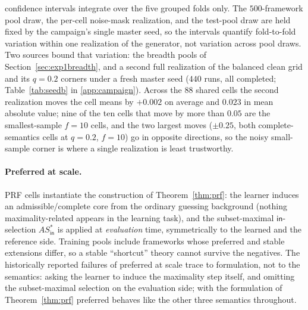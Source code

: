 \documentclass[review,12pt]{elsarticle}
\theoremstyle{definition}
\theoremstyle{remark}
\newcommand{\pred}[1]{\textsf{#1}}
\newcommand{\ASstar}{\mathit{AS}^{*}}
\begin{document}
confidence intervals integrate over the five grouped folds only. The
$500$-framework pool draw, the per-cell noise-mask realization, and the
test-pool draw are held fixed by the campaign's single master seed, so the
intervals quantify fold-to-fold variation within one realization of the
generator, not variation across pool draws. Two sources bound that variation:
the breadth pools of Section~\ref{sec:exp1breadth}, and a second full
realization of the balanced clean grid and its $q{=}0.2$ corners under a fresh
master seed ($440$ runs, all completed; Table~\ref{tab:seedb} in
\ref{app:campaign}). Across the $88$ shared cells the second realization moves
the cell means by $+0.002$ on average and $0.023$ in mean absolute value; nine
of the ten cells that move by more than $0.05$ are the smallest-sample
$f{=}10$ cells, and the two largest moves ($\pm0.25$, both complete-semantics
cells at $q{=}0.2$, $f{=}10$) go in opposite directions, so the noisy
small-sample corner is where a single realization is least trustworthy.

\paragraph{Preferred at scale.} PRF cells instantiate the construction of
Theorem~\ref{thm:prf}: the learner induces an admissible/complete core from
the ordinary guessing background (nothing maximality-related appears in the
learning task), and the subset-maximal $\pred{in}$-selection $\ASstar_{\pred{in}}$
is applied at \emph{evaluation} time, symmetrically to the learned and the
reference side. Training pools include frameworks whose preferred and stable
extensions differ, so a stable ``shortcut'' theory cannot survive the
negatives. The historically reported failures of preferred at scale trace to
formulation, not to the semantics: asking the learner to induce the maximality
step itself, and omitting the subset-maximal selection on the evaluation side;
with the formulation of Theorem~\ref{thm:prf} preferred behaves like the other
three semantics throughout.
\end{document}
